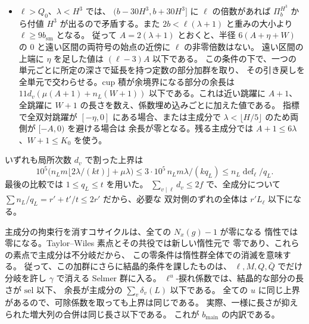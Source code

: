 \begin{itemize}
\item \(\ell>Q_0\)、\(\lambda<H^3\) では、
\((b-30H^3,b+30H^3]\) に \(\ell\) の倍数があれば
\(\Pi_b^{H^3}\) から付値 \(H^3\) が出るので矛盾する。また
\(2b<\ell(\lambda+1)\) と重みの大小より \(\ell\ge9b_{\mathrm{sm}}\) となる。
従って \(A=2(\lambda+1)\) とおくと、半径 \(6(A+\eta+W)\) の
\(0\) と遠い区間の両符号の始点の近傍に \(\ell\) の非零倍数はない。
遠い区間の上端に \(\eta\) を足した値は \((\ell-3)A\) 以下である。
この条件の下で、一つの単元ごとに所定の深さで延長を持つ定数の部分加群を取り、
その引き戻しを全単元で交わらせる。cup 積が余境界になる部分の余長は
\(11d_v(\mu(A+1)+n_L(W+1))\) 以下である。これは近い跳躍に \(A+1\)、
全跳躍に \(W+1\) の長さを数え、係数埋め込みごとに加えた値である。
指標で全双対跳躍が \([-\eta,0]\) にある場合、または主成分で
\(\lambda<\lfloor H/5\rfloor\) のため両側が \([-A,0)\) を避ける場合は
余長が零となる。残る主成分では \(A+1\le6\lambda\)、\(W+1\le K_0\)
を使う。
\end{itemize}

いずれも局所次数 \(d_v\) で割った上界は
\[
 10^5\bigl(n_L m\lfloor 2\lambda/(kt)\rfloor+\mu\lambda\bigr)
 \le 3\cdot 10^5\,n_L m\lambda/(kq_L)
 \le n_L\operatorname{def}_\ell/q_L.
\]
最後の比較では \(1\le q_L\le t\) を用いた。
\(\sum_{v\mid\ell}d_v\le 2f\) で、全成分について
\(\sum n_L/q_L=r'+t'/t\le2r'\) だから、必要な
双対側のずれの全体は \(r'L_\ell\) 以下になる。

主成分の拘束行を消すコサイクルは、全ての \(N_x(g)-1\) が零になる
惰性では零になる。Taylor--Wiles 素点とその共役では新しい惰性元で
零であり、これらの素点で主成分は不分岐だから、
この零条件は惰性群全体での消滅を意味する。
従って、この加群にさらに結晶的条件を課したものは、
\(\ell,M,Q,\bar Q\) でだけ分岐を許し \(\gamma\) で消える Selmer 群に入る。
\(\ell^u\)-捩れ係数では、結晶的な部分の長さが \(\mathrm{sel}\) 以下、
余長が主成分の \(\sum_v\delta_v(L)\) 以下である。
全ての \(u\) に同じ上界があるので、可除係数を取っても上界は同じである。
実際、一様に長さが抑えられた増大列の合併は同じ長さ以下である。
これが \(b_{\mathrm{main}}\) の内訳である。

